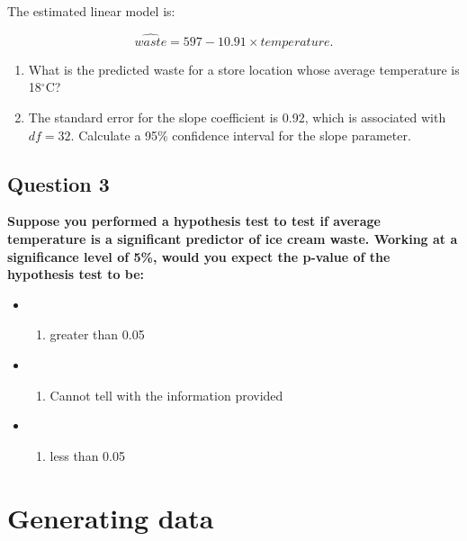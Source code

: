 \documentclass[
]{book}
\providecommand{\tightlist}{%
  \setlength{\itemsep}{0pt}\setlength{\parskip}{0pt}}
\begin{document}
The estimated linear model is:

\[\hat{waste} = 597 - 10.91 \times temperature.\]

\begin{enumerate}
\def\labelenumi{\arabic{enumi}.}
\item
  What is the predicted waste for a store location whose average temperature is 18\(^{\circ}\)C?
\item
  The standard error for the slope coefficient is 0.92, which is associated with \(df=32\). Calculate a 95\% confidence interval for the slope parameter.
\end{enumerate}

\hypertarget{question-3}{%
\subsection*{Question 3}\label{question-3}}

\textbf{Suppose you performed a hypothesis test to test if average temperature is a significant predictor of ice cream waste. Working at a significance level of 5\%, would you expect the p-value of the hypothesis test to be:}

\begin{itemize}
\item
  \begin{enumerate}
  \def\labelenumi{(\Alph{enumi})}
  \tightlist
  \item
    greater than 0.05\\
  \end{enumerate}
\item
  \begin{enumerate}
  \def\labelenumi{(\Alph{enumi})}
  \setcounter{enumi}{1}
  \tightlist
  \item
    Cannot tell with the information provided\\
  \end{enumerate}
\item
  \begin{enumerate}
  \def\labelenumi{(\Alph{enumi})}
  \setcounter{enumi}{2}
  \tightlist
  \item
    less than 0.05
  \end{enumerate}
\end{itemize}

\hypertarget{generating-data}{%
\section{Generating data}\label{generating-data}}
\end{document}
